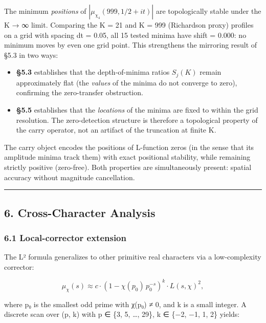 \documentclass[
  11pt,
]{article}
\providecommand{\tightlist}{%
  \setlength{\itemsep}{0pt}\setlength{\parskip}{0pt}}
\begin{document}
The minimum \emph{positions} of \(|\mu_{\chi_4}(999, 1/2 + it)|\) are
topologically stable under the K → ∞ limit. Comparing the K = 21 and K = 999
(Richardson proxy) profiles on a grid with spacing dt = 0.05, all 15 tested
minima have shift = 0.000: no minimum moves by even one grid point. This
strengthens the mirroring result of §5.3 in two ways:

\begin{itemize}
\tightlist
\item
  \textbf{§5.3} establishes that the depth-of-minima ratios \(S_j(K)\) remain
  approximately flat (the \emph{values} of the minima do not converge to zero),
  confirming the zero-transfer obstruction.
\item
  \textbf{§5.5} establishes that the \emph{locations} of the minima are fixed to
  within the grid resolution. The zero-detection structure is therefore a
  topological property of the carry operator, not an artifact of the truncation
  at finite K.
\end{itemize}

The carry object encodes the positions of L-function zeros (in the sense that
its amplitude minima track them) with exact positional stability, while
remaining strictly positive (zero-free). Both properties are simultaneously
present: spatial accuracy without magnitude cancellation.

\begin{center}\rule{0.5\linewidth}{0.5pt}\end{center}

\newpage

\subsection{6. Cross-Character Analysis}\label{cross-character-analysis}

\subsubsection{6.1 Local-corrector extension}\label{local-corrector-extension}

The L² formula generalizes to other primitive real characters via a
low-complexity corrector:

\[\mu_\chi(s) \approx c \cdot (1 - \chi(p_0)\, p_0^{-s})^k \cdot L(s, \chi)^2,\]

where p₀ is the smallest odd prime with χ(p₀) ≠ 0, and k is a small integer. A
discrete scan over (p, k) with p ∈ \{3, 5, \ldots, 29\}, k ∈ \{−2, −1, 1, 2\}
yields:
\end{document}
